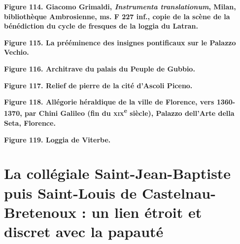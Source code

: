 \documentclass[12pt,twoside,openany]{book}
\begin{document}
\begin{center}
\par\small \textbf{Figure 114. Giacomo Grimaldi, \textit{Instrumenta translationum}, Milan, bibliothèque Ambrosienne, ms. F 227 inf., copie de la scène de la bénédiction du cycle de fresques de la loggia du Latran.}
\end{center}

\begin{center}
\par\small \textbf{Figure 115. La prééminence des insignes pontificaux sur le Palazzo Vechio.}
\end{center}

\begin{center}
\par\small \textbf{Figure 116. Architrave du palais du Peuple de Gubbio.}
\end{center}

\begin{center}
\par\small \textbf{Figure 117. Relief de pierre de la cité d’Ascoli Piceno.}
\end{center}

\begin{center}
\par\small \textbf{Figure 118. Allégorie héraldique de la ville de Florence, vers 1360-1370, par Chini Galileo (fin du \textsc{xix}\textsuperscript{e} siècle), Palazzo dell’Arte della Seta, Florence.}
\end{center}

\begin{center}
\par\small \textbf{Figure 119. Loggia de Viterbe.}
\end{center}

\chapter{La collégiale Saint-Jean-Baptiste puis Saint-Louis de Castelnau-Bretenoux : un lien étroit et discret avec la papauté}
\end{document}
